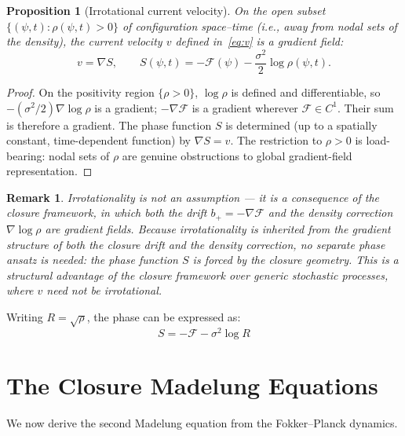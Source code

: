 \documentclass[12pt]{article}
\newtheorem{proposition}[theorem]{Proposition}
\newtheorem{remark}[theorem]{Remark}
\newcommand{\Fcal}{\mathcal{F}}
\begin{document}
\begin{proposition}[Irrotational current velocity]\label{prop:irrotational}
On the open subset $\{(\psi, t) : \rho(\psi, t) > 0\}$ of configuration space--time (i.e., away from nodal sets of the density), the current velocity $v$ defined in~\eqref{eq:v} is a gradient field:
\begin{equation}\label{eq:v_gradient}
    v = \nabla S, \qquad S(\psi,t) = -\Fcal(\psi) - \frac{\sigma^2}{2}\log\rho(\psi,t).
\end{equation}
\end{proposition}

\begin{proof}
On the positivity region $\{\rho > 0\}$, $\log\rho$ is defined and differentiable, so $-(\sigma^2/2)\nabla\log\rho$ is a gradient; $-\nabla\Fcal$ is a gradient wherever $\Fcal \in C^1$. Their sum is therefore a gradient. The phase function $S$ is determined (up to a spatially constant, time-dependent function) by $\nabla S = v$. The restriction to $\rho > 0$ is load-bearing: nodal sets of $\rho$ are genuine obstructions to global gradient-field representation.
\end{proof}

\begin{remark}
Irrotationality is not an assumption --- it is a consequence of the closure framework, in which both the drift $b_+ = -\nabla\Fcal$ and the density correction $\nabla\log\rho$ are gradient fields. Because irrotationality is inherited from the gradient structure of both the closure drift and the density correction, no separate phase ansatz is needed: the phase function $S$ is forced by the closure geometry. This is a structural advantage of the closure framework over generic stochastic processes, where $v$ need not be irrotational.
\end{remark}

Writing $R = \sqrt{\rho}$, the phase can be expressed as:
\begin{equation}\label{eq:S}
    S = -\Fcal - \sigma^2\log R
\end{equation}

\section{The Closure Madelung Equations}\label{sec:madelung}

We now derive the second Madelung equation from the Fokker--Planck dynamics.
\end{document}
